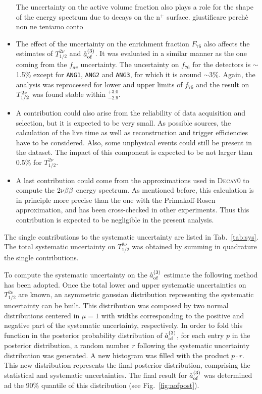 \begin{itemize}
		The uncertainty on the active volume fraction also plays a role for the shape of the energy spectrum due to  decays on the n$^+$ surface. {\color{red}giustificare perchè non ne teniamo conto}
	\item The effect of the uncertainty on the enrichment fraction $F_{76}$ also affects the estimates of $T_{1/2}^{2\nu}$ and $\mathring{a}_\text{of}^{(3)}$. It was evaluated in a similar manner as the one coming from the $f_{av}$ uncertainty. The uncertainty on $f_{76}$ for the detectors is $\sim$1.5\% except for \texttt{ANG1}, \texttt{ANG2} and \texttt{ANG3}, for which it is around $\sim$3\%. Again, the analysis was reprocessed for lower and upper limits of $f_{76}$ and the result on $T_{1/2}^{2\nu}$ was found stable within $^{+3.0}_{-2.9}$.
	\item A contribution could also arise from the reliability of data acquisition and selection, but it is expected to be very small. As possible sources, the calculation of the live time as well as reconstruction and trigger efficiencies have to be considered. Also, some unphysical events could still be present in the dataset. The impact of this component is expected to be not larger than 0.5\% for $T_{1/2}^{2\nu}$.
	\item A last contribution could come from the approximations used in \textsc{Decay0} to compute the $2\nu\beta\beta$ energy spectrum. As mentioned before, this calculation is in principle more precise than the one with the Primakoff-Rosen approximation, and has been cross-checked in other experiments. Thus this contribution is expected to be negligible in the present analysis.
\end{itemize}

The single contributions to the systematic uncertainty are listed in Tab.~\ref{tab:sys}. The total systematic uncertainty on $T_{1/2}^{2\nu}$ was obtained by summing in quadrature the single contributions.

To compute the systematic uncertainty on the $\mathring{a}_\text{of}^{(3)}$ estimate the following method has been adopted. Once the total lower and upper systematic uncertainties on $T_{1/2}^{2\nu}$ are known, an asymmetric gaussian distribution representing the systematic uncertainty can be built. This distribution was composed by two normal distributions centered in $\mu=1$ with widths corresponding to the positive and negative part of the systematic uncertainty, respectively. In order to fold this function in the posterior probability distribution of $\mathring{a}_\text{of}^{(3)}$, for each entry $p$ in the posterior distribution, a random number $r$ following the systematic uncertainty distribution was generated. A new histogram was filled with the product $p\cdot r$. This new distribution represents the final posterior distribution, comprising the statistical and systematic uncertainties. The final result for $\mathring{a}_\text{of}^{(3)}$ was determined ad the 90\% quantile of this distribution (see Fig.~\ref{fig:aofpost}).

